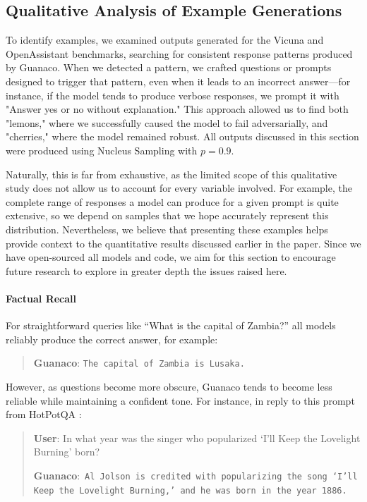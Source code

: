 \subsection{Qualitative Analysis of Example Generations}
\label{ssec:examples}

To identify examples, we examined outputs generated for the Vicuna and OpenAssistant benchmarks, searching for consistent response patterns produced by {Guanaco}. When we detected a pattern, we crafted questions or prompts designed to trigger that pattern, even when it leads to an incorrect answer—for instance, if the model tends to produce verbose responses, we prompt it with "Answer yes or no without explanation." This approach allowed us to find both "lemons," where we successfully caused the model to fail adversarially, and "cherries," where the model remained robust. All outputs discussed in this section were produced using Nucleus Sampling \cite{holtzmancurious} with $p=0.9$.

Naturally, this is far from exhaustive, as the limited scope of this qualitative study does not allow us to account for every variable involved. For example, the complete range of responses a model can produce for a given prompt is quite extensive, so we depend on samples that we hope accurately represent this distribution. Nevertheless, we believe that presenting these examples helps provide context to the quantitative results discussed earlier in the paper. Since we have open-sourced all models and code, we aim for this section to encourage future research to explore in greater depth the issues raised here.  
\paragraph{Factual Recall} For straightforward queries like ``What is the capital of Zambia?'' all models reliably produce the correct answer, for example:  

\begin{quote} 
    \textbf{Guanaco}:
    \texttt{The capital of Zambia is Lusaka.}
\end{quote}

However, as questions become more obscure, {Guanaco} tends to become less reliable while maintaining a confident tone. For instance, in reply to this prompt from HotPotQA \citep{yang2018hotpotqa}:  

\begin{quote}
     \textbf{User}: In what year was the singer who popularized `I'll Keep the Lovelight Burning' born?  

     \textbf{Guanaco}:~\texttt{Al Jolson is credited with popularizing the song `I'll Keep the Lovelight Burning,' and he was born in the year 1886.}
 \end{quote}

